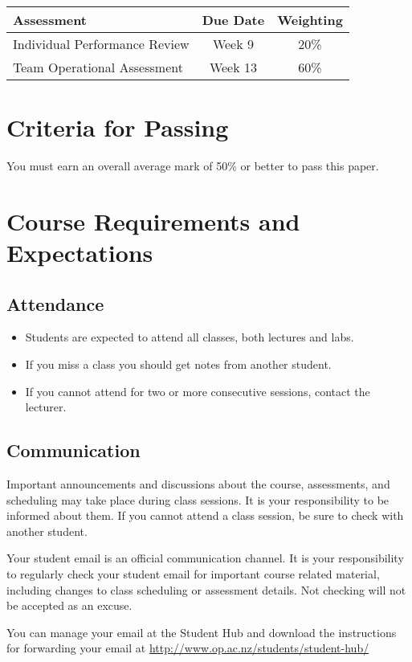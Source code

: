 \documentclass{article}
\begin{document}
\begin{tabular}{|l|c|c|}
\hline
Assessment & Due Date & Weighting \\ \hline
Individual Performance Review & Week 9 & 20\% \\ \hline
Team Operational Assessment & Week 13 & 60\% \\ \hline
\end{tabular}


\section*{Criteria for Passing}
You must earn an overall average mark of 50\% or better to pass this paper.

\section*{Course Requirements and Expectations}
\subsection*{Attendance}
\begin{itemize}
 \item Students are expected to attend all classes, both lectures and labs.
 \item If you miss a class you should get notes from another student.
 \item If you cannot attend for two or more consecutive sessions, contact the lecturer.
\end{itemize}

\subsection*{Communication}
Important announcements and discussions about the course, assessments, and scheduling may take place during class sessions.  It is your responsibility to be informed about them.  If you cannot attend a class session, be sure to check with another student.

Your student email is an official communication channel. It is your responsibility to regularly check your student email for important course related material, including changes to class scheduling or assessment details. Not checking will not be accepted as an excuse.

You can manage your email at the Student Hub and download the instructions for forwarding your email at \url{http://www.op.ac.nz/students/student-hub/}
\end{document}
